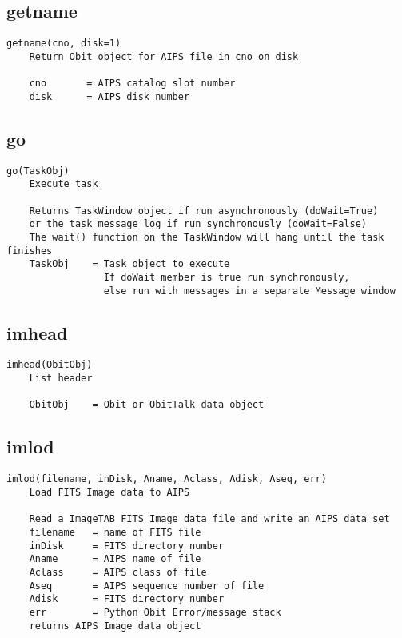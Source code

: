 \documentclass[11pt]{report}
\begin{document}
\subsection{getname}
\begin{verbatim}
getname(cno, disk=1)
    Return Obit object for AIPS file in cno on disk
    
    cno       = AIPS catalog slot number 
    disk      = AIPS disk number
\end{verbatim}

\subsection{go}
\begin{verbatim}
go(TaskObj)
    Execute task
    
    Returns TaskWindow object if run asynchronously (doWait=True)
    or the task message log if run synchronously (doWait=False)
    The wait() function on the TaskWindow will hang until the task finishes
    TaskObj    = Task object to execute
                 If doWait member is true run synchronously,
                 else run with messages in a separate Message window
\end{verbatim}

\subsection{imhead}
\begin{verbatim}
imhead(ObitObj)
    List header
    
    ObitObj    = Obit or ObitTalk data object
\end{verbatim}

\subsection{imlod}
\begin{verbatim}
imlod(filename, inDisk, Aname, Aclass, Adisk, Aseq, err)
    Load FITS Image data to AIPS
    
    Read a ImageTAB FITS Image data file and write an AIPS data set
    filename   = name of FITS file
    inDisk     = FITS directory number
    Aname      = AIPS name of file
    Aclass     = AIPS class of file
    Aseq       = AIPS sequence number of file
    Adisk      = FITS directory number
    err        = Python Obit Error/message stack
    returns AIPS Image data object
\end{verbatim}
\end{document}

